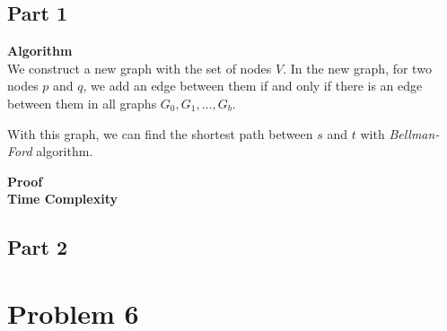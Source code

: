 \documentclass{article}
\newcommand{\Complexity}{\vspace{0.3cm} \noindent\textbf{Time Complexity} \\}
\newcommand{\Proof}{\vspace{0.3cm} \noindent\textbf{Proof} \\}
\newcommand{\Algorithm}{\textbf{Algorithm} \\}
\begin{document}
\subsection*{Part 1}
\Algorithm
We construct a new graph with the set of nodes $V$. In the new graph, for two nodes $p$ and $q$,
we add an edge between them if and only if there is an edge between them in all graphs $G_0, G_1,
\dots, G_b$.

With this graph, we can find the shortest path between $s$ and $t$ with \textit{Bellman-Ford} 
algorithm.

\Proof

\Complexity

\subsection*{Part 2}


\section*{Problem 6}
\end{document}
